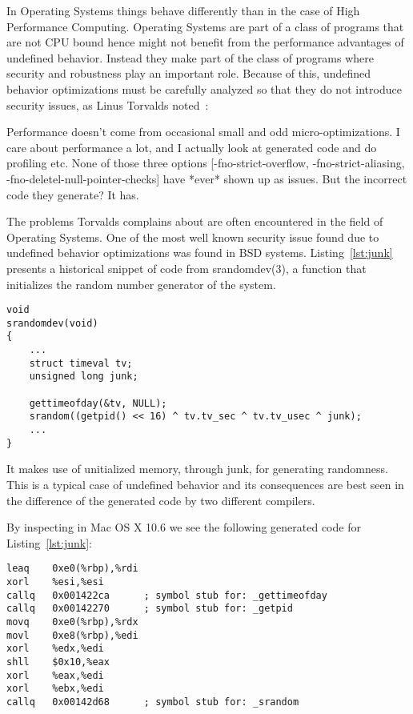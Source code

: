 In Operating Systems things behave differently than in the case of High
Performance Computing. Operating Systems are part of a class of programs
that are not CPU bound hence might not benefit from the performance
advantages of undefined behavior. Instead they make part of the class of
programs where security and robustness play an important role. Because
of this, undefined behavior optimizations must be carefully analyzed so
that they do not introduce security issues, as Linus Torvalds
noted~\cite{linusgcc}:
\begin{displayquote}
Performance doesn't come from occasional small and odd
micro-optimizations. I care about performance a lot, and I actually look
at generated code and do profiling etc. None of those three options
[-fno-strict-overflow, -fno-strict-aliasing,
-fno-deletel-null-pointer-checks] have *ever* shown up as issues. But
the incorrect code they generate? It has.
\end{displayquote}

The problems Torvalds complains about are often encountered in the field
of Operating Systems. One of the most well known security issue found
due to undefined behavior optimizations was found in BSD systems.
Listing~\ref{lst:junk} presents a historical snippet of code from
srandomdev(3), a function that initializes the random number generator
of the system.

\begin{lstlisting}[style=Cstyle, caption={srandom function in
lib/libc/stdlib/random.c on BSD systems}, label={lst:junk}]
void
srandomdev(void)
{
	...
	struct timeval tv;
	unsigned long junk;

	gettimeofday(&tv, NULL);
	srandom((getpid() << 16) ^ tv.tv_sec ^ tv.tv_usec ^ junk);
	...
}
\end{lstlisting}

It makes use of unitialized memory, through junk, for generating
randomness. This is a typical case of undefined behavior and its
consequences are best seen in the difference of the generated code by
two different compilers.

By inspecting  in Mac OS X 10.6 we see
the following generated code for Listing~\ref{lst:junk}:
\begin{lstlisting}[style=Cstyle, caption={}, label={lst:junk}]
leaq    0xe0(%rbp),%rdi
xorl    %esi,%esi
callq   0x001422ca      ; symbol stub for: _gettimeofday
callq   0x00142270      ; symbol stub for: _getpid
movq    0xe0(%rbp),%rdx
movl    0xe8(%rbp),%edi
xorl    %edx,%edi
shll    $0x10,%eax
xorl    %eax,%edi
xorl    %ebx,%edi
callq   0x00142d68      ; symbol stub for: _srandom
\end{lstlisting}

